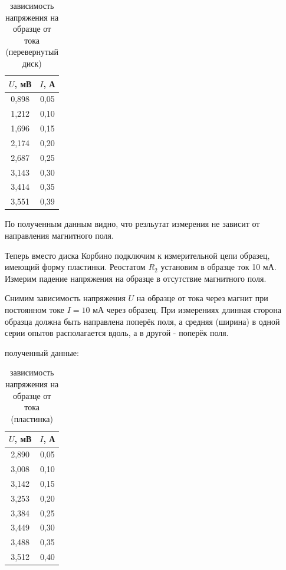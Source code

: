 \documentclass[a4paper, 12pt]{article}%
\begin{document}
\begin{table}[!h]
\begin{center}
\begin{tabular}{|c|c|}
\hline $U$, мВ & $I$, А\\
\hline 0,898 & 0,05 \\
\hline 1,212 & 0,10 \\
\hline 1,696 & 0,15 \\
\hline 2,174 & 0,20 \\
\hline 2,687 & 0,25 \\
\hline 3,143 & 0,30 \\
\hline 3,414 & 0,35 \\
\hline 3,551 & 0,39 \\
\hline
\end{tabular}
\end{center}
\caption{зависимость напряжения на образце от тока (перевернутый диск)}
\end{table}


По полученным данным видно, что резльутат измерения не зависит от направления магнитного поля. 



Теперь  вместо диска Корбино подключим к измерительной цепи образец, имеющий форму пластинки. Реостатом $R_{2}$ установим в образце ток 10 мА. Измерим падение напряжения на образце в отсутствие магнитного поля.


Снимим зависимость напряжения $U$ на образце от тока через магнит при постоянном токе $I=10$ мА через образец. При измерениях длинная сторона образца должна быть направлена поперёк поля, а средняя (ширина) в одной серии опытов располагается вдоль, а в другой - поперёк поля.

полученный данные: 

\begin{table}[!h]
\begin{center}
\begin{tabular}{|c|c|}
\hline	$U$, мВ  & $I$, А  \\
\hline 2,890 & 0,05 \\
\hline 3,008 & 0,10 \\
\hline 3,142 & 0,15 \\
\hline 3,253 & 0,20 \\
\hline 3,384 & 0,25 \\
\hline 3,449 & 0,30 \\
\hline 3,488 & 0,35 \\
\hline 3,512 & 0,40 \\
\hline
\end{tabular}
\end{center}
\caption{зависимость напряжения на образце от тока (пластинка)}
\end{table}
\end{document}
